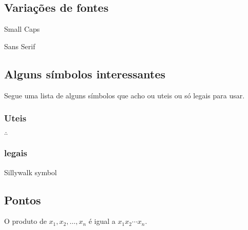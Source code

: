 \documentclass[]{article}
\begin{document}
\subsection{Variações de fontes}
{\sc Small Caps} 

{\sf Sans Serif}

\subsection{Alguns símbolos interessantes}
Segue uma lista de alguns símbolos que acho ou uteis ou só legais para usar.
\subsubsection{Uteis}
$\therefore$

\subsubsection{legais}
Sillywalk symbol \Denarius

\subsection{Pontos}
O produto de $ x_1, x_2, \dots, x_n$ é igual a $x_1 x_2 \cdots x_n$.
\end{document}
